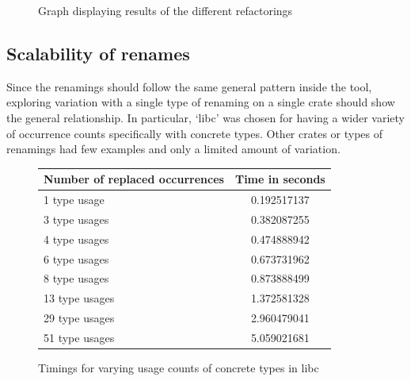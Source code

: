 \begin{figure}[H]
\begin{center}
\caption{Graph displaying results of the different refactorings}
\label{Fig:compareref}
\end{center}
\end{figure}

\subsection{Scalability of renames}
Since the renamings should follow the same general pattern inside the tool, exploring variation with a single type of renaming on a single crate should show the general relationship. In particular, `libc' was chosen for having a wider variety of occurrence counts specifically with concrete types. Other crates or types of renamings had few examples and only a limited amount of variation.

\begin{figure}[H]
\begin{center}
    \begin{tabular}{ | l | c |}
    \hline
    \textbf{Number of replaced occurrences} & \textbf{Time in seconds} \\ \hline
    1 type usage &  0.192517137  \\ \hline
    3 type usages &  0.382087255  \\ \hline
    4 type usages &   0.474888942  \\ \hline
    6 type usages &   0.673731962  \\ \hline
    8 type usages &   0.873888499 \\ \hline
    13 type usages  &  1.372581328 \\ \hline
    29 type usages &  2.960479041  \\ \hline
    51 type usages &  5.059021681 \\ \hline
    \end{tabular}
\end{center}

\caption{Timings for varying usage counts of concrete types in libc}
\label{Fig:scaling}
\end{figure}

